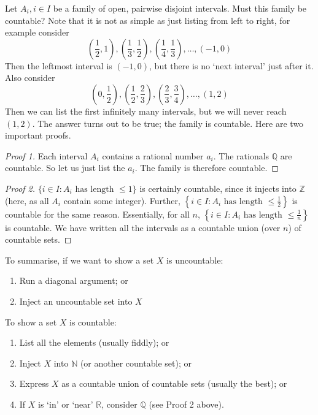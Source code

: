 \begin{example}
	Let \(A_i, i \in I\) be a family of open, pairwise disjoint intervals.
	Must this family be countable?
	Note that it is not as simple as just listing from left to right, for example consider
	\[
		\left(\frac{1}{2}, 1\right), \left(\frac{1}{3}, \frac{1}{2}\right), \left(\frac{1}{4}, \frac{1}{3}\right), \dots, (-1, 0)
	\]
	Then the leftmost interval is \((-1, 0)\), but there is no `next interval' just after it.
	Also consider
	\[
		\left( 0, \frac{1}{2} \right), \left( \frac{1}{2}, \frac{2}{3} \right), \left( \frac{2}{3}, \frac{3}{4} \right), \dots, (1, 2)
	\]
	Then we can list the first infinitely many intervals, but we will never reach \((1, 2)\).
	The answer turns out to be true; the family is countable.
	Here are two important proofs.
	\begin{proof}[Proof 1]
		Each interval \(A_i\) contains a rational number \(a_i\).
		The rationals \(\mathbb Q\) are countable.
		So let us just list the \(a_i\).
		The family is therefore countable.
	\end{proof}
	\begin{proof}[Proof 2]
		\(\{ i \in I: A_i \text{ has length } \leq 1\}\) is certainly countable, since it injects into \(\mathbb Z\) (here, as all \(A_i\) contain some integer).
		Further, \(\left\{ i \in I: A_i \text{ has length } \leq \frac{1}{2} \right\}\) is countable for the same reason.
		Essentially, for all \(n\), \(\left\{ i \in I: A_i \text{ has length } \leq \frac{1}{n} \right\}\) is countable.
		We have written all the intervals as a countable union (over \(n\)) of countable sets.
	\end{proof}
\end{example}

To summarise, if we want to show a set \(X\) is uncountable:
\begin{enumerate}
	\item Run a diagonal argument; or
	\item Inject an uncountable set into \(X\)
\end{enumerate}
To show a set \(X\) is countable:
\begin{enumerate}
	\item List all the elements (usually fiddly); or
	\item Inject \(X\) into \(\mathbb N\) (or another countable set); or
	\item Express \(X\) as a countable union of countable sets (usually the best); or
	\item If \(X\) is `in' or `near' \(\mathbb R\), consider \(\mathbb Q\) (see Proof 2 above).
\end{enumerate}


